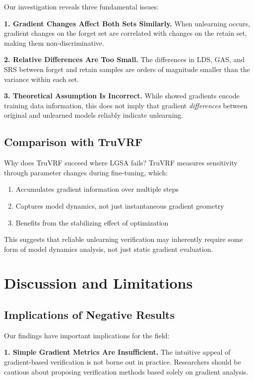 \documentclass{article}
\begin{document}
Our investigation reveals three fundamental issues:

\textbf{1. Gradient Changes Affect Both Sets Similarly.} When unlearning occurs, gradient changes on the forget set are correlated with changes on the retain set, making them non-discriminative.

\textbf{2. Relative Differences Are Too Small.} The differences in LDS, GAS, and SRS between forget and retain samples are orders of magnitude smaller than the variance within each set.

\textbf{3. Theoretical Assumption Is Incorrect.} While \citet{zhu2019deep} showed gradients encode training data information, this does not imply that gradient \emph{differences} between original and unlearned models reliably indicate unlearning.

\subsection{Comparison with TruVRF}

Why does TruVRF succeed where LGSA fails? TruVRF measures sensitivity through parameter changes during fine-tuning, which:
\begin{enumerate}
    \item Accumulates gradient information over multiple steps
    \item Captures model dynamics, not just instantaneous gradient geometry
    \item Benefits from the stabilizing effect of optimization
\end{enumerate}

This suggests that reliable unlearning verification may inherently require some form of model dynamics analysis, not just static gradient evaluation.

\section{Discussion and Limitations}
\label{sec:discussion}

\subsection{Implications of Negative Results}

Our findings have important implications for the field:

\textbf{1. Simple Gradient Metrics Are Insufficient.} The intuitive appeal of gradient-based verification is not borne out in practice. Researchers should be cautious about proposing verification methods based solely on gradient analysis.
\end{document}
